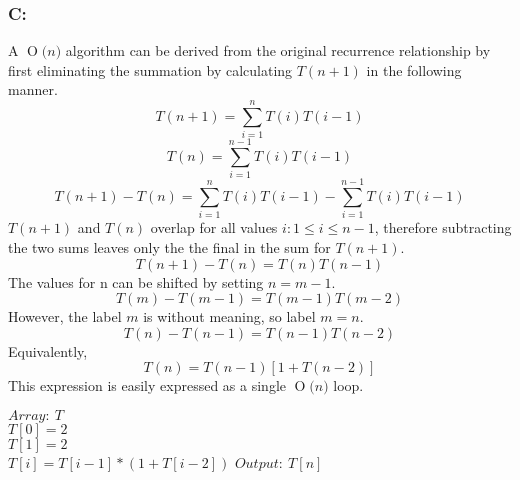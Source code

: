 \documentclass[12pt]{article}
\newcommand{\BigO}[1]{\ensuremath{\operatorname{O}\bigl(#1\bigr)}}
\begin{document}
\subsubsection*{C:}
A \BigO{n} algorithm can be derived from the original recurrence
relationship by first eliminating the summation by calculating
$T(n+1)$ in the following manner.
\[
T(n+1) = \sum_{i=1}^{n}T(i)T(i-1)
\]
\[
T(n) = \sum_{i=1}^{n-1}T(i)T(i-1)
\]
\[
T(n+1) - T(n) = \sum_{i=1}^{n}T(i)T(i-1) - \sum_{i=1}^{n-1}T(i)T(i-1)  
\]
$T(n+1)$ and $T(n)$ overlap for all values $i:1\leq i\leq n-1$, therefore
subtracting the two sums leaves only the the final in the sum for $T(n+1)$.
\[
T(n+1) - T(n) = T(n)T(n-1)
\] 
The values for n can be shifted by setting $n = m-1$.
\[
T(m) - T(m-1) = T(m-1)T(m-2)
\]
However, the label $m$ is without meaning, so label $m=n$.
\[
T(n) - T(n-1) = T(n-1)T(n-2)
\]
Equivalently,
\[
T(n) = T(n-1)[1+T(n-2)]
\]
This expression is easily expressed as a single \BigO{n} loop.\\
\begin{algorithm}[H]
$Array:\ T$\\
$T[0] = 2$\\
$T[1] = 2$\\
{$T[i] = T[i-1]*(1+T[i-2])$}
$Output:\ T[n]$
\end{algorithm}
\end{document}
